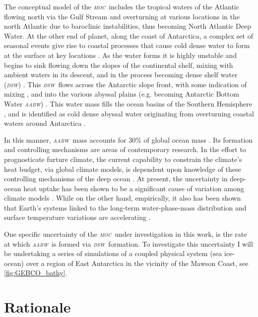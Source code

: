 \documentclass[11pt,a4paper]{article}
\newcommand{\moc}{\textit{\textsc{moc}}} %
\newcommand{\dsw}{\textit{\textsc{{dsw}}}} %
\newcommand{\aabw}{\textit{\textsc{{aabw}}}} %
\begin{document}
The conceptual model of the \moc~includes the tropical waters of the Atlantic flowing north via the Gulf Stream
and overturning at various locations in the north Atlantic due to baroclinic
instabilities, thus becoming North Atlantic Deep Water. At the other
end of planet, along the coast of Antarctica, a complex set
of seasonal events give rise to coastal processes that cause cold dense water
to form at the surface at key locations \citep{Orsi1999,Talley2013}. As the water
forms it is highly unstable and begins to sink flowing down the slopes of the
continental shelf, mixing with ambient waters in its descent, and in the process
becoming dense shelf water (\dsw) \citep{Orsi2001}.
This \dsw~flows across the Antarctic slope front, with some indication of mixing \citep{Mizuta2021,VanAchter2021,Rintoul2018}, and into the various abyssal plains (e.g. becoming Antarctic Bottom Water \textemdash \aabw)
\citep{Stewart2019}. This water mass fills the ocean basins of the Southern Hemisphere \citep{Johnson2008}, and is
identified as cold dense abyssal water originating from overturning coastal
waters around Antarctica \citep{Orsi1999}.

In this manner, \aabw~mass accounts for 30\% of global ocean
mass \citep{Johnson2008}. Its formation and controlling mechanisms are areas of contemporary research. In the effort to prognosticate furture climate, the current capability to constrain the climate's heat budget,
via global climate models, is dependent upon knowledge of these
controlling mechanisms of the deep ocean
\citep{Domingues2008,Murphy2009,Purkey2012,Durack2018}. At present, the
uncertainty in deep-ocean heat uptake has been shown to be a significant cause
of variation among climate models \citep{Boe2009,Durack2018}. While on the other hand, empirically, it also has been
shown that Earth's systems linked to the long-term water-phase-mass distribution
and surface temperature variations are accelerating
\citep{Murphy2009,IPCC2019SpecialReport}.

One specific uncertainty of the \moc~under investigation in this
work, is the rate at which \aabw~is formed via \dsw~formation. To investigate
this uncertainty I will be undertaking a series of simulations of a coupled
physical system (sea ice-ocean) over a region of East Antarctica in the vicinity
of the Mawson Coast, see \ref{fig:GEBCO_bathy}.

\section*{Rationale}
%
\end{document}
